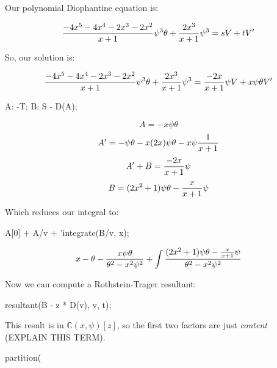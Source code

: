 \vfill\eject

Our polynomial Diophantine equation is:

$${{{-4x^5-4x^4-2x^3-2x^2}\over{x+1}}\psi^3\theta + {{2x^3}\over{x+1}}\psi^3}
  = sV + tV'$$


So, our solution is:

$${{{-4x^5-4x^4-2x^3-2x^2}\over{x+1}}\psi^3\theta + {{2x^3}\over{x+1}}\psi^3}
  = {-2x\over{x+1}}\psi V + x\psi\theta V'$$

\begin{maximacode}
A: -T;
B: S - D(A);
\end{maximacode}

$$A = -x\psi\theta$$
$$A' = -\psi\theta - x(2x)\psi\theta - x\psi{1\over{x+1}}$$
$$A' + B = {-2x\over{x+1}}\psi$$
$$B = (2x^2+1)\psi\theta - {x\over{x+1}}\psi$$

Which reduces our integral to:

\begin{maximacode}
A[0] + A/v + 'integrate(B/v, x);
\end{maximacode}


{\LARGE$$x - \theta - {x\psi\theta\over{\theta^2-x^2\psi^2}} +  \int{{(2x^2+1)\psi\theta - {x\over{x+1}}\psi}\over{\theta^2-x^2\psi^2}}$$}



Now we can compute a Rothstein-Trager resultant:

\begin{maximacode}
resultant(B - z * D(v), v, t);
\end{maximacode}

This result is in ${\mathbb C}(x,\psi)[z]$, so the first two factors are just
{\it content} (EXPLAIN THIS TERM).

\begin{maximacode}
partition(%
\end{maximacode}

